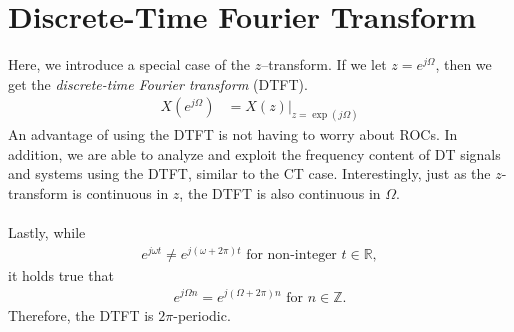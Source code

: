 \documentclass{report}
\begin{document}
\setcounter{chapter}{4}
\setcounter{page}{54}
\chapter{Discrete-Time Fourier Transform}

Here, we introduce a special case of the $z$--transform. If we let $z=e^{j\Omega}$, then we get the \emph{discrete-time Fourier transform} (DTFT).
\begin{align}
    X(e^{j\Omega}) &= X(z)\big|_{z=\exp(j\Omega)}
\end{align}
An advantage of using the DTFT is not having to worry about ROCs. In addition, we are able to analyze and exploit the frequency content of DT signals and systems 
using the DTFT, similar to the CT case. Interestingly, just as the $z$-transform is continuous in $z$, the DTFT is also continuous in $\Omega$.
\\ \\
Lastly, while 
\begin{align}
    e^{j\omega t} \neq e^{j(\omega+2\pi)t} \text{ for non-integer } t\in\mathbb{R},
\end{align}
it holds true that 
\begin{align}
    e^{j\Omega n} = e^{j(\Omega+2\pi)n} \text{ for } n\in\mathbb{Z}.
\end{align}
Therefore, the DTFT is $2\pi$-periodic.
\end{document}
